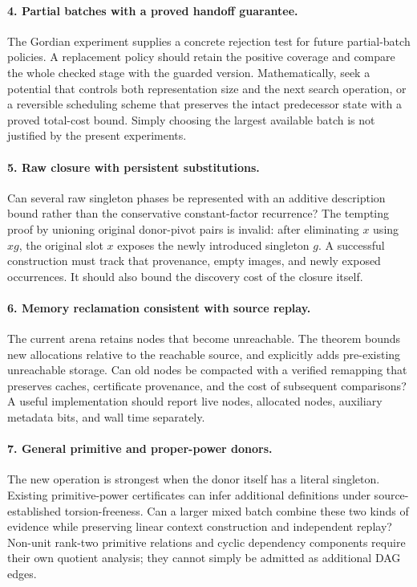 \paragraph{4. Partial batches with a proved handoff guarantee.}
The Gordian experiment supplies a concrete rejection test for future
partial-batch policies. A replacement policy should retain the positive
coverage and compare the whole checked stage with the guarded version.
Mathematically, seek a potential that controls both representation size
and the next search operation, or a reversible scheduling scheme that
preserves the intact predecessor state with a proved total-cost bound.
Simply choosing the largest available batch is not justified by the
present experiments.

\paragraph{5. Raw closure with persistent substitutions.}
Can several raw singleton phases be represented with an additive
description bound rather than the conservative constant-factor recurrence?
The tempting proof by unioning original donor-pivot pairs is invalid:
after eliminating $x$ using $xg$, the original slot $x$ exposes the newly
introduced singleton $g$. A successful construction must track that
provenance, empty images, and newly exposed occurrences. It should also
bound the discovery cost of the closure itself.

\paragraph{6. Memory reclamation consistent with source replay.}
The current arena retains nodes that become unreachable. The theorem
bounds new allocations relative to the reachable source, and explicitly
adds pre-existing unreachable storage. Can old nodes be compacted with a
verified remapping that preserves caches, certificate provenance, and
the cost of subsequent comparisons? A useful implementation should report
live nodes, allocated nodes, auxiliary metadata bits, and wall time
separately.

\paragraph{7. General primitive and proper-power donors.}
The new operation is strongest when the donor itself has a literal
singleton. Existing primitive-power certificates can infer additional
definitions under source-established torsion-freeness. Can a larger
mixed batch combine these two kinds of evidence while preserving linear
context construction and independent replay? Non-unit rank-two primitive
relations and cyclic dependency components require their own quotient
analysis; they cannot simply be admitted as additional DAG edges.

